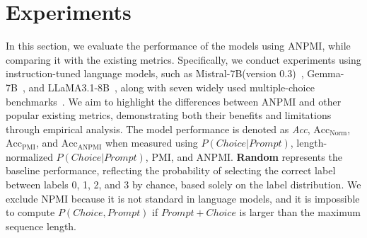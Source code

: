 
\section{Experiments}
In this section, we evaluate the performance of the models using ANPMI, while comparing it with the existing metrics. Specifically, we conduct experiments using instruction-tuned language models, such as Mistral-7B(version 0.3)~\citep{jiang2024mixtral}, Gemma-7B~\citep{team2024gemma}, and LLaMA3.1-8B~\citep{dubey2024llama}, along with seven widely used multiple-choice benchmarks~\cite{hellaswag, bisk2020piqa, clark2018think, hendrycks2020measuring, welbl2017crowdsourcing, liu2021logiqa, lai2017race}. We aim to highlight the differences between ANPMI and other popular existing metrics, demonstrating both their benefits and limitations through empirical analysis. The model performance is denoted as \textit{Acc}, \textit{$\text{Acc}_\text{Norm}$}, \textit{$\text{Acc}_\text{PMI}$}, and \textit{$\text{Acc}_\text{ANPMI}$} when measured using {\small $P(Choice|Prompt)$}, length-normalized {\small $P(Choice|Prompt)$}, PMI, and ANPMI. 
\textbf{Random} represents the baseline performance, reflecting the probability of selecting the correct label between labels 0, 1, 2, and 3 by chance, based solely on the label distribution. We exclude NPMI because it is not standard in language models, and it is impossible to compute {\small $P(Choice, Prompt)$} if {\small $Prompt+Choice$}  is larger than the maximum sequence length.

